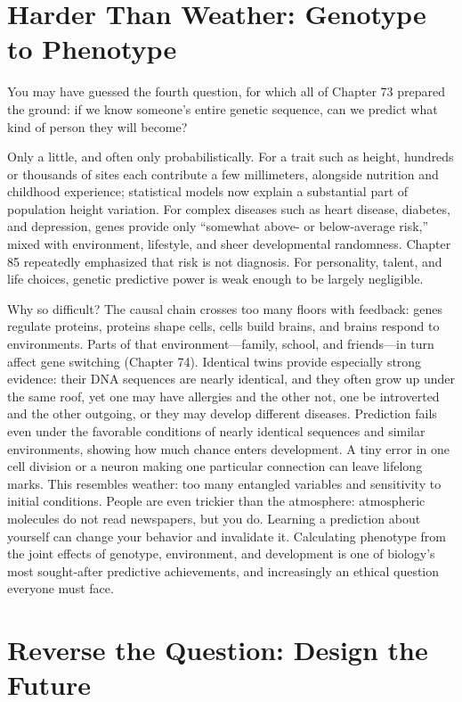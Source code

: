 \section{Harder Than Weather: Genotype to Phenotype}

You may have guessed the fourth question, for which all of Chapter 73 prepared the ground: if we know someone's entire genetic sequence, can we predict what kind of person they will become?

Only a little, and often only probabilistically. For a trait such as height, hundreds or thousands of sites each contribute a few millimeters, alongside nutrition and childhood experience; statistical models now explain a substantial part of population height variation. For complex diseases such as heart disease, diabetes, and depression, genes provide only ``somewhat above- or below-average risk,'' mixed with environment, lifestyle, and sheer developmental randomness. Chapter 85 repeatedly emphasized that risk is not diagnosis. For personality, talent, and life choices, genetic predictive power is weak enough to be largely negligible.

Why so difficult? The causal chain crosses too many floors with feedback: genes regulate proteins, proteins shape cells, cells build brains, and brains respond to environments. Parts of that environment---family, school, and friends---in turn affect gene switching (Chapter 74). Identical twins provide especially strong evidence: their DNA sequences are nearly identical, and they often grow up under the same roof, yet one may have allergies and the other not, one be introverted and the other outgoing, or they may develop different diseases. Prediction fails even under the favorable conditions of nearly identical sequences and similar environments, showing how much chance enters development. A tiny error in one cell division or a neuron making one particular connection can leave lifelong marks. This resembles weather: too many entangled variables and sensitivity to initial conditions. People are even trickier than the atmosphere: atmospheric molecules do not read newspapers, but you do. Learning a prediction about yourself can change your behavior and invalidate it. Calculating phenotype from the joint effects of genotype, environment, and development is one of biology's most sought-after predictive achievements, and increasingly an ethical question everyone must face.

\section{Reverse the Question: Design the Future}

